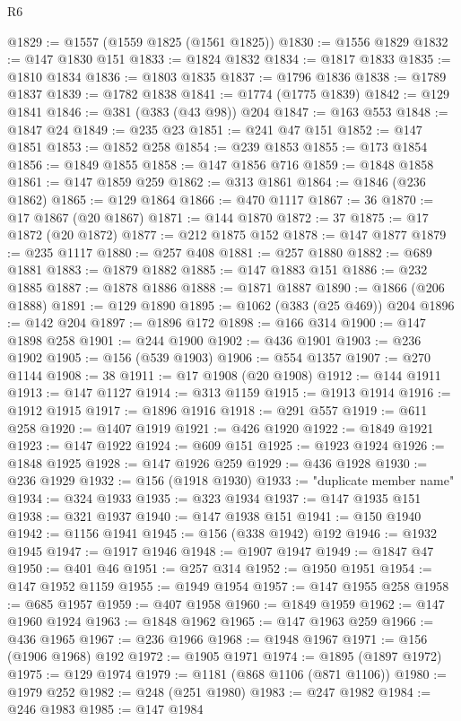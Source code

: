 \begin{lexlean}{R6}
\begin{coremodule}
@1829 := @1557 (@1559 @1825 (@1561 @1825))
@1830 := @1556 @1829
@1832 := @147 @1830 @151
@1833 := @1824 @1832
@1834 := @1817 @1833
@1835 := @1810 @1834
@1836 := @1803 @1835
@1837 := @1796 @1836
@1838 := @1789 @1837
@1839 := @1782 @1838
@1841 := @1774 (@1775 @1839)
@1842 := @129 @1841
@1846 := @381 (@383 (@43 @98)) @204
@1847 := @163 @553
@1848 := @1847 @24
@1849 := @235 @23
@1851 := @241 @47 @151
@1852 := @147 @1851
@1853 := @1852 @258
@1854 := @239 @1853
@1855 := @173 @1854
@1856 := @1849 @1855
@1858 := @147 @1856 @716
@1859 := @1848 @1858
@1861 := @147 @1859 @259
@1862 := @313 @1861
@1864 := @1846 (@236 @1862)
@1865 := @129 @1864
@1866 := @470 @1117
@1867 := 36
@1870 := @17 @1867 (@20 @1867)
@1871 := @144 @1870
@1872 := 37
@1875 := @17 @1872 (@20 @1872)
@1877 := @212 @1875 @152
@1878 := @147 @1877
@1879 := @235 @1117
@1880 := @257 @408
@1881 := @257 @1880
@1882 := @689 @1881
@1883 := @1879 @1882
@1885 := @147 @1883 @151
@1886 := @232 @1885
@1887 := @1878 @1886
@1888 := @1871 @1887
@1890 := @1866 (@206 @1888)
@1891 := @129 @1890
@1895 := @1062 (@383 (@25 @469)) @204
@1896 := @142 @204
@1897 := @1896 @172
@1898 := @166 @314
@1900 := @147 @1898 @258
@1901 := @244 @1900
@1902 := @436 @1901
@1903 := @236 @1902
@1905 := @156 (@539 @1903)
@1906 := @554 @1357
@1907 := @270 @1144
@1908 := 38
@1911 := @17 @1908 (@20 @1908)
@1912 := @144 @1911
@1913 := @147 @1127
@1914 := @313 @1159
@1915 := @1913 @1914
@1916 := @1912 @1915
@1917 := @1896 @1916
@1918 := @291 @557
@1919 := @611 @258
@1920 := @1407 @1919
@1921 := @426 @1920
@1922 := @1849 @1921
@1923 := @147 @1922
@1924 := @609 @151
@1925 := @1923 @1924
@1926 := @1848 @1925
@1928 := @147 @1926 @259
@1929 := @436 @1928
@1930 := @236 @1929
@1932 := @156 (@1918 @1930)
@1933 := "duplicate member name"
@1934 := @324 @1933
@1935 := @323 @1934
@1937 := @147 @1935 @151
@1938 := @321 @1937
@1940 := @147 @1938 @151
@1941 := @150 @1940
@1942 := @1156 @1941
@1945 := @156 (@338 @1942) @192
@1946 := @1932 @1945
@1947 := @1917 @1946
@1948 := @1907 @1947
@1949 := @1847 @47
@1950 := @401 @46
@1951 := @257 @314
@1952 := @1950 @1951
@1954 := @147 @1952 @1159
@1955 := @1949 @1954
@1957 := @147 @1955 @258
@1958 := @685 @1957
@1959 := @407 @1958
@1960 := @1849 @1959
@1962 := @147 @1960 @1924
@1963 := @1848 @1962
@1965 := @147 @1963 @259
@1966 := @436 @1965
@1967 := @236 @1966
@1968 := @1948 @1967
@1971 := @156 (@1906 @1968) @192
@1972 := @1905 @1971
@1974 := @1895 (@1897 @1972)
@1975 := @129 @1974
@1979 := @1181 (@868 @1106 (@871 @1106))
@1980 := @1979 @252
@1982 := @248 (@251 @1980)
@1983 := @247 @1982
@1984 := @246 @1983
@1985 := @147 @1984

\end{coremodule}
\end{lexlean}
